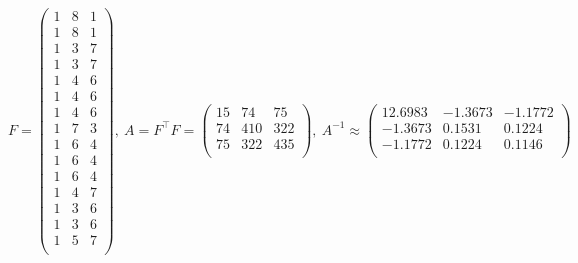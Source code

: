 \documentclass[12 pt]{article}
\begin{document}
 $$
F = \begin{pmatrix}1 &8 &1 \\
    1 &8 &1 \\
    1 &3 &7 \\
    1 &3 &7 \\
    1 &4 &6 \\
    1 &4 &6 \\
    1 &4 &6 \\
    1 &7 &3 \\
    1 &6 &4 \\
    1 &6 &4 \\
    1 &6 &4 \\
    1 &4 &7 \\
    1 &3 &6 \\
    1 &3 &6 \\
    1 &5 &7 \\
    \end{pmatrix}, \ 
A = F^\top F = 
\begin{pmatrix}15 &74 &75 \\
    74 &410 &322 \\
    75 &322 &435 \\
    \end{pmatrix}, \ 
A^{-1} \approx 
\begin{pmatrix}12.6983 &-1.3673&-1.1772\\
    -1.3673 & 0.1531 &0.1224 \\
    -1.1772 & 0.1224 &0.1146 \\
    \end{pmatrix}
 $$
\end{document}
